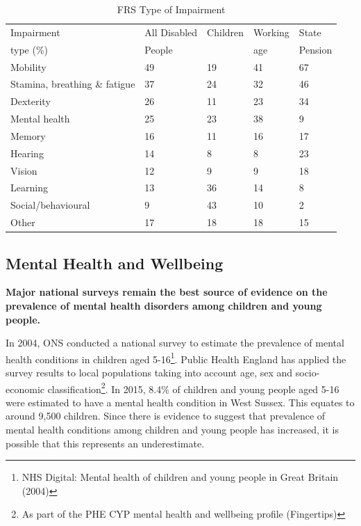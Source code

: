 \begin{table}[hbt]
    \caption{FRS Type of Impairment}
    \centering
    \begin{tabular}{lllll}
    \toprule
    Impairment & All Disabled & Children & Working & State \\
    type (\%) & People & \ & age & Pension \\
    \midrule
    Mobility & 49 & 19 & 41 & 67 \\
    Stamina, breathing \& fatigue & 37 & 24 & 32 & 46 \\
    Dexterity & 26 & 11 & 23 & 34 \\
    Mental health & 25 & 23 & 38 & 9 \\
    Memory & 16 & 11 & 16 & 17 \\
    Hearing & 14 & 8 & 8 & 23 \\
    Vision & 12 & 9 & 9 & 18 \\
    Learning & 13 & 36 & 14 & 8 \\
    Social/behavioural & 9 & 43 & 10 & 2 \\
    Other & 17 & 18 & 18 & 15 \\
    \bottomrule
    \end{tabular}
    \label{tab:impairment}
\end{table}

\subsection{Mental Health and Wellbeing}
{\bfseries Major national surveys remain the best source of evidence on the prevalence of mental health disorders among children and young people.}

In 2004, ONS conducted a national survey to estimate the prevalence of mental health conditions in children aged 5-16\footnote{NHS Digital: Mental health of children and young people in Great Britain (2004)}. Public Health England has applied the survey results to local populations taking into account age, sex and socio-economic classification\footnote{As part of the PHE CYP mental health and wellbeing profile (Fingertips)}. In 2015, 8.4\% of children and young people aged 5-16 were estimated to have a mental health condition in West Sussex. This equates to around 9,500 children. Since there is evidence to suggest that prevalence of mental health conditions among children and young people has increased, it is possible that this represents an underestimate.

